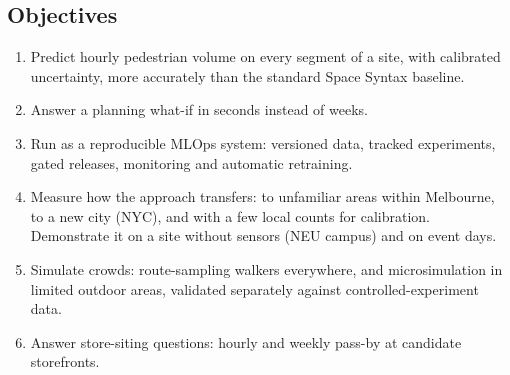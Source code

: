 \documentclass[11pt]{article}
\begin{document}
\subsection{Objectives}
\begin{enumerate}
  \item Predict hourly pedestrian volume on every segment of a site, with calibrated uncertainty, more accurately than the standard Space Syntax baseline.
  \item Answer a planning what-if in seconds instead of weeks.
  \item Run as a reproducible MLOps system: versioned data, tracked experiments, gated releases, monitoring and automatic retraining.
  \item Measure how the approach transfers: to unfamiliar areas within Melbourne, to a new city (NYC), and with a few local counts for calibration. Demonstrate it on a site without sensors (NEU campus) and on event days.
  \item Simulate crowds: route-sampling walkers everywhere, and microsimulation in limited outdoor areas, validated separately against controlled-experiment data.
  \item Answer store-siting questions: hourly and weekly pass-by at candidate storefronts.
\end{enumerate}
\end{document}

